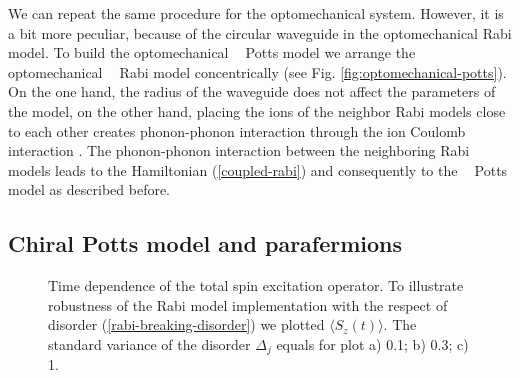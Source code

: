 \documentclass[reprint, aps, prx, amsmath, amssymb, longbibliography, superscriptaddress]{revtex4-2}
\DeclareMathOperator{\Zthree}{\mathbb{Z}_3}
\begin{document}
We can repeat the same procedure for the optomechanical system. However, it is a bit more peculiar, because of the circular waveguide in the optomechanical Rabi model. To build the optomechanical $\Zthree$ Potts model we arrange the optomechanical $\Zthree$ Rabi model concentrically (see Fig. \ref{fig:optomechanical-potts}). On the one hand, the radius of the waveguide does not affect the parameters of the model, on the other hand, placing the ions of the neighbor Rabi models close to each other creates phonon-phonon interaction through the ion Coulomb interaction \cite{schneider_experimental_2012,timm_dynamics_2023}. The phonon-phonon interaction between the neighboring Rabi models leads to the Hamiltonian (\ref{coupled-rabi}) and consequently to the $\Zthree$ Potts model as described before.


\subsection{Chiral Potts model and parafermions}


\begin{figure}[t]
    \captionsetup[subfloat]{captionskip=-135pt} %
    \centering
    \caption{Time dependence of the total spin excitation operator. To illustrate robustness of the Rabi model implementation with the respect of disorder (\ref{rabi-breaking-disorder}) we plotted $\langle S_z(t) \rangle$. The standard variance of the disorder $\Delta_j$ equals for plot a) 0.1; b) 0.3; c) 1.}
    \label{fig:spin-excitation-plot}
\end{figure}
\end{document}
